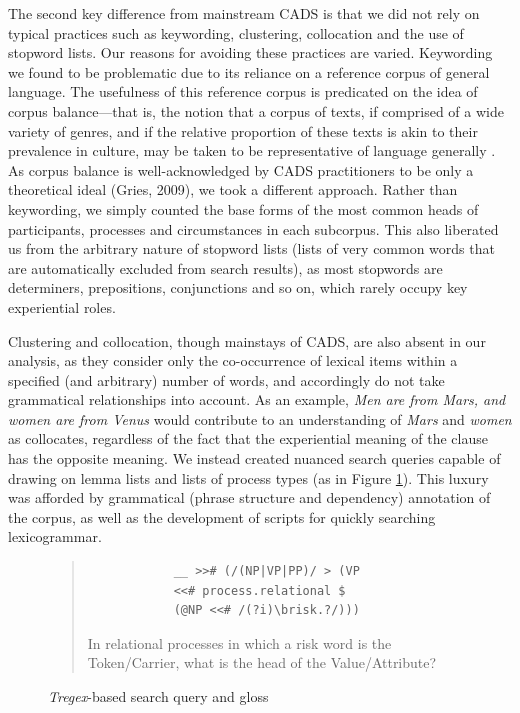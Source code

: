 		The second key difference from mainstream CADS is that we did not rely on typical practices such as keywording, clustering, collocation and the use of stopword lists. Our reasons for avoiding these practices are varied. Keywording we found to be problematic due to its reliance on a reference corpus of general language. The usefulness of this reference corpus is predicated on the idea of corpus balance---that is, the notion that a corpus of texts, if comprised of a wide variety of genres, and if the relative proportion of these texts is akin to their prevalence in culture, may be taken to be representative of language generally \cite{chen_sinica_1996}. As corpus balance is well-acknowledged by CADS practitioners to be only a theoretical ideal (Gries, 2009), we took a different approach. Rather than keywording, we simply counted the base forms of the most common heads of participants, processes and circumstances in each subcorpus. This also liberated us from the arbitrary nature of stopword lists (lists of very common words that are automatically excluded from search results), as most stopwords are determiners, prepositions, conjunctions and so on, which rarely occupy key experiential roles.

		Clustering and collocation, though mainstays of CADS, are also absent in our analysis, as they consider only the co-occurrence of lexical items within a specified (and arbitrary) number of words, and accordingly do not take grammatical relationships into account. As an example, \emph{Men are from Mars, and women are from Venus} would contribute to an understanding of \emph{Mars} and \emph{women} as collocates, regardless of the fact that the experiential meaning of the clause has the opposite meaning. We instead created nuanced search queries capable of drawing on lemma lists and lists of process types (as in Figure \ref{fig:glossed}). This luxury was afforded by grammatical (phrase structure and dependency) annotation of the corpus, as well as the development of scripts for quickly searching lexicogrammar.



			\begin{figure}
			\begin{quote}
			\begin{multicols}{2}
			\begin{verbatim}
			__ >># (/(NP|VP|PP)/ > (VP
			<<# process.relational $ 
			(@NP <<# /(?i)\brisk.?/)))
			\end{verbatim}
			\noindent In relational processes in which a risk word is the Token/Carrier, what is the head of the Value\slash Attribute?
			\end{multicols}
			\end{quote}
			\caption{\emph{Tregex}-based search query and gloss}
			\label{fig:glossed}
			\end{figure}

